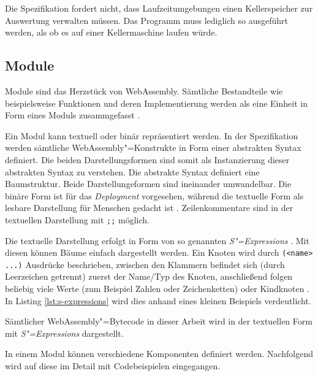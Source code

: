 Die Spezifikation fordert nicht, dass Laufzeitumgebungen einen Kellerspeicher zur Auswertung verwalten müssen. Das Programm muss lediglich so ausgeführt werden, als ob es auf einer Kellermaschine laufen würde.

\subsection{Module}
\label{subsec:WebAssembly-Module}
Module sind das Herzstück von WebAssembly. Sämtliche Bestandteile wie beispielsweise Funktionen und deren Implementierung werden als eine Einheit in Form eines Moduls zusammgefasst \cite{WebAssemblySpecification}.

Ein Modul kann textuell oder binär repräsentiert werden. In der Spezifikation werden sämtliche WebAssembly"=Konstrukte in Form einer abstrakten Syntax definiert. Die beiden Darstellungsformen sind somit als Instanzierung dieser abstrakten Syntax zu verstehen. Die abstrakte Syntax definiert eine Baumstruktur. Beide Darstellungeformen sind ineinander umwandelbar. Die binäre Form ist für das \emph{Deployment} vorgesehen, während die textuelle Form als lesbare Darstellung für Menschen gedacht ist \cite{WebAssemblySpecification} \cite{MDNWebAssembly}. Zeilenkommentare sind in der textuellen Darstellung mit \lstinline{;;} möglich.

Die textuelle Darstellung erfolgt in Form von so genannten \emph{S"=Expressions} \cite{WebAssemblySpecification}. Mit diesen können Bäume einfach dargestellt werden. Ein Knoten wird durch \lstinline{(<name> ...)} Ausdrücke beschrieben, zwischen den Klammern befindet sich (durch Leerzeichen getrennt) zuerst der Name/Typ des Knoten, anschließend folgen beliebig viele Werte (zum Beispiel Zahlen oder Zeichenketten) oder Kindknoten \cite{MDNWebAssembly}. In Listing \ref{lst:s-expressions} wird dies anhand eines kleinen Beispiels verdeutlicht.



Sämtlicher WebAssembly"=Bytecode in dieser Arbeit wird in der textuellen Form mit \emph{S"=Expressions} dargestellt.

In einem Modul können verschiedene Komponenten definiert werden. Nachfolgend wird auf diese im Detail mit Codebeispielen eingegangen.


